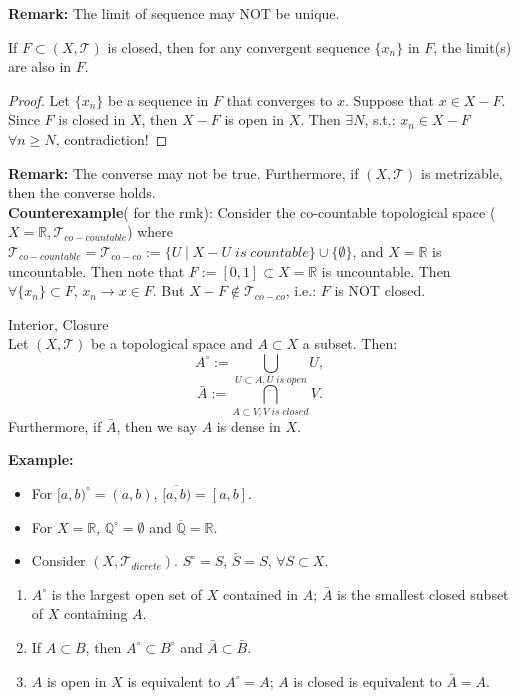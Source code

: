 \noindent\textbf{Remark:} The limit of sequence may NOT be unique.

\begin{proposition}
    If $F \subset (X, \mathcal{T})$ is closed, then for any convergent sequence $\{x_n\}$ in $F$, the limit(s) are also in $F$.
\end{proposition}

\begin{proof}
    Let $\{x_n\}$ be a sequence in $F$ that converges to $x$. Suppose that $x \in X-F$. Since $F$ is closed in $X$, then $X-F$ is open in $X$. Then $\exists N$, s.t.: $x_n \in X-F$ $\forall n \geq N$, contradiction!
\end{proof}

\noindent\textbf{Remark:} The converse may not be true. Furthermore, if $(X,\mathcal{T})$ is metrizable, then the converse holds.\\
\textbf{Counterexample}( for the rmk): Consider the co-countable topological space ($X = \mathbb{R},\mathcal{T}_{co-countable}$) where $\mathcal{T}_{co-countable} = \mathcal{T}_{co-co}:=\{U \mid X-U \; is \; countable\} \cup \{\emptyset \}$, and $X =\mathbb{R}$ is uncountable. Then note that $F:=[0,1] \subset X =\mathbb{R}$ is uncountable. Then $\forall \{x_n\} \subset F$, $x_n \rightarrow x \in F$. But $X-F \notin \mathcal{T}_{co-co}$, i.e.: $F$ is NOT closed.

\begin{definition}{Interior, Closure}\\
Let $(X,\mathcal{T})$ be a topological space and $A \subset X$ a subset. Then:
$$A^\circ := \bigcup_{U\subset A, U \; is \; open}U,$$
$$\bar{A}:=\bigcap_{A \subset V, V \;is\;closed}V.$$
Furthermore, if $\bar{A}$, then we say $A$ is dense in $X$.
\end{definition}

\noindent\textbf{Example:}
\begin{itemize}
    \item For $[a,b)^\circ = (a,b)$, $\overline{[a,b)}=[a,b]$.
    \item For $X=\mathbb{R}$, $\mathbb{Q}^\circ = \emptyset$ and $\overline{ \mathbb{Q}}= \mathbb{R}$.
    \item Consider $(X,\mathcal{T}_{dicrete})$. $S^\circ =S$, $\bar{S}=S$, $\forall S \subset X$.
\end{itemize}

\begin{proposition}
    \begin{enumerate}
        \item $A^\circ$ is the largest open set of $X$ contained in $A$; $\bar{A}$ is the smallest closed subset of $X$ containing $A$.
        \item If $A \subset B$, then $A^\circ \subset B^\circ$ and $\bar{A} \subset \bar{B}$.
        \item $A$ is open in $X$ is equivalent to $A^\circ =A$; $A$ is closed is equivalent to $\bar{A}=A$.
    \end{enumerate}
\end{proposition}

